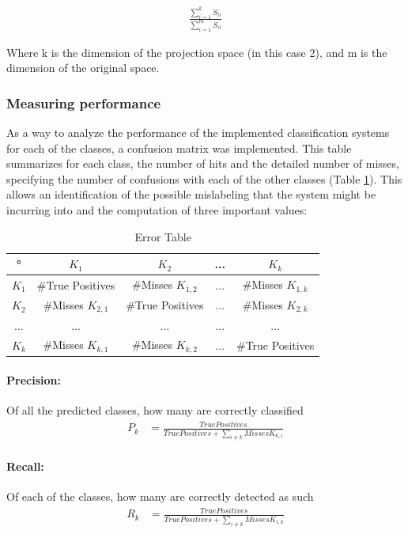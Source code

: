 \documentclass{IEEEtran}
\begin{document}
\begin{align}
\frac{\sum_{i=1}^{k}S_{ii}}{\sum_{i=1}^{m}S_{ii}} \label{eq:svderr}
\end{align}

Where k is the dimension of the projection space (in this case 2), and m is the dimension of the original space.

\subsubsection{Measuring performance}
\label{sub:measures}
As a way to analyze the performance of the implemented classification systems for each of the classes, 
a confusion matrix was implemented. 
This table summarizes for each class, the number of hits and the detailed number of misses, specifying 
the number of confusions with each of the other classes (Table \ref{tb:tbError}).
This allows an identification of the possible mislabeling that the system might be incurring into and
the computation of three important values:

\begin{table}
\centering
\begin{tabular}{|c | c | c| c| c|}
\hline
° &  $K_{1}$ &  $K_{2}$  & ... & $K_{k}$ \\
\hline
 $K_{1}$  & \#True Positives & \#Misses $K_{1,2}$ & ... & \#Misses $K_{1,k}$  \\
\hline
 $K_{2}$  & \#Misses $K_{2,1}$ & \#True Positives &  ... & \#Misses $K_{2,k}$  \\
\hline
... & ... & ... & ... & ... \\
\hline
 $K_{k}$  & \#Misses $K_{k,1}$ & \#Misses $K_{k,2}$ & ... & \#True Positives   \\
\hline
\end{tabular}
\caption{Error Table}
\label{tb:tbError}
\end{table}
 
\paragraph{Precision:}  
Of all the predicted classes, how many are correctly classified 
\begin{align}
P_k &= \frac{True Positives}{True Positives + \sum_{i \ne k}{Misses K_{k,i}}} \label{eq:precision} 
\end{align}
\paragraph{Recall:} 
Of each of the classes, how many are correctly detected as such 
\begin{align}
R_k &= \frac{True Positives}{True Positives + \sum_{i \ne k}{Misses K_{i,k}}} \label{eq:recall}
\end{align}
\end{document}
